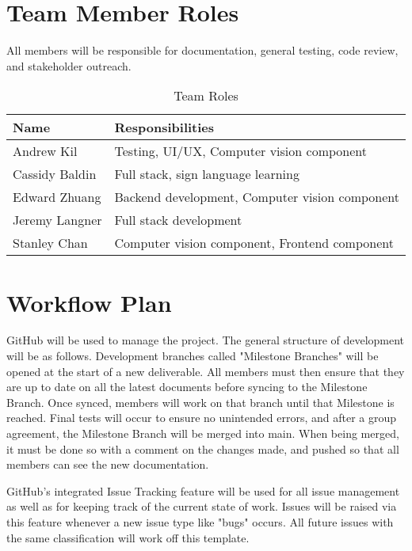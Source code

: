 \documentclass{article}
\begin{document}
\section{Team Member Roles}

All members will be responsible for documentation, general testing, code review, and stakeholder outreach. 

\begin{table}%
\caption{Team Roles} \label{TblRoles}
\begin{tabularx}{\textwidth}{ll}
\toprule
\textbf{Name} & \textbf{Responsibilities}\\
\midrule
Andrew Kil & Testing, UI/UX, Computer vision component\\
Cassidy Baldin & Full stack, sign language learning\\
Edward Zhuang & Backend development, Computer vision component\\
Jeremy Langner & Full stack development\\
Stanley Chan & Computer vision component, Frontend component\\
\bottomrule
\end{tabularx}
\end{table}

\section{Workflow Plan}

GitHub will be used to manage the project. The general structure of development will be as follows. Development branches called "Milestone Branches" will be opened at the start of a new deliverable. All members must then ensure that they are up to date on all the latest documents before syncing to the Milestone Branch. Once synced, members will work on that branch until that Milestone is reached. Final tests will occur to ensure no unintended errors, and after a group agreement, the Milestone Branch will be merged into main. When being merged, it must be done so with a comment on the changes made, and pushed so that all members can see the new documentation.

GitHub's integrated Issue Tracking feature will be used for all issue management as well as for keeping track of the current state of work.  Issues will be raised via this feature whenever a new issue type like "bugs" occurs. All future issues with the same classification will work off this template.
\end{document}
